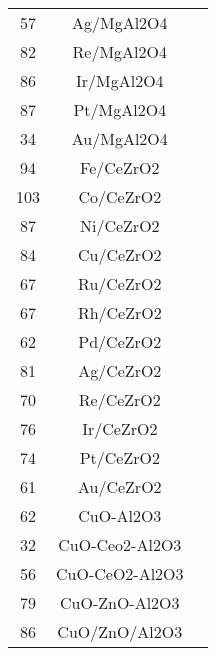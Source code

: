 \begin{center}
\begin{longtable}{ccc}
57                   & Ag/MgAl2O4              & \cite{Boisen_2010}         \\
82                   & Re/MgAl2O4              & \cite{Boisen_2010}         \\
86                   & Ir/MgAl2O4              & \cite{Boisen_2010}         \\
87                   & Pt/MgAl2O4              & \cite{Boisen_2010}         \\
34                   & Au/MgAl2O4              & \cite{Boisen_2010}         \\
94                   & Fe/CeZrO2               & \cite{Boisen_2010}         \\
103                  & Co/CeZrO2               & \cite{Boisen_2010}         \\
87                   & Ni/CeZrO2               & \cite{Boisen_2010}         \\
84                   & Cu/CeZrO2               & \cite{Boisen_2010}         \\
67                   & Ru/CeZrO2               & \cite{Boisen_2010}         \\
67                   & Rh/CeZrO2               & \cite{Boisen_2010}         \\
62                   & Pd/CeZrO2               & \cite{Boisen_2010}         \\
81                   & Ag/CeZrO2               & \cite{Boisen_2010}         \\
70                   & Re/CeZrO2               & \cite{Boisen_2010}         \\
76                   & Ir/CeZrO2               & \cite{Boisen_2010}         \\
74                   & Pt/CeZrO2               & \cite{Boisen_2010}         \\
61                   & Au/CeZrO2               & \cite{Boisen_2010}         \\
62                   & CuO-Al2O3               & \cite{Koryabkina_2003}         \\
32                   & CuO-Ceo2-Al2O3          & \cite{Koryabkina_2003}         \\
56                   & CuO-CeO2-Al2O3          & \cite{Koryabkina_2003}         \\
79                   & CuO-ZnO-Al2O3           & \cite{Koryabkina_2003}         \\
86                   & CuO/ZnO/Al2O3           & \cite{Koryabkina_2003}         \\

\end{longtable}
\end{center}
